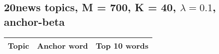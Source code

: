 \documentclass{article}
\begin{document}
\begin{table}[h]
\begin{center}
\begin{tabular}{|c|c|l|}
          \end{tabular}

       \label{tab:M700_0 topics}
   \end{center}
\vspace{-10pt}
\end{table}

\newpage

\subsection{20news topics, M = 700, K = 40, $\lambda=0.1$, {\bf anchor-beta}}
\label{appendix:K40-LAMBDA0P1}

\begin{table}[h]
   \begin{center}
  \begin{tabular}{|c|c|l|} \hline
           Topic & Anchor word & Top 10 words \\ \hline


\end{tabular}
\end{center}
\end{table}
\end{document}
